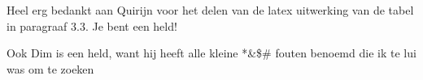 Heel erg bedankt aan Quirijn voor het delen van de latex uitwerking van de tabel in paragraaf 3.3. Je bent een held!\medskip

\noindent Ook Dim is een held, want hij heeft alle kleine *\&\$\# fouten benoemd die ik te lui was om te zoeken
